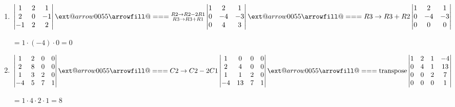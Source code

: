 \documentclass{beamer}
\makeatletter
\newcommand*{\Relbarfill@}{\arrowfill@\Relbar\Relbar\Relbar}
\newcommand*{\xequal}[2][]{\ext@arrow 0055\Relbarfill@{#1}{#2}}
\theoremstyle{definition}
\theoremstyle{remark}
\newcounter{saveenumi}
\newcommand{\conti}{\setcounter{enumi}{\value{saveenumi}}}
\makeatother
\begin{document}
\begin{frame}[t]
\begin{example}
\begin{enumerate}
\conti
\item 
$\left|\begin{matrix}
1&2&1\\
2&0&-1\\
-1&2&2\\
\end{matrix}\right|\xequal{\substack{R2\rightarrow R2-2R1\\R3\rightarrow R3+R1}}\left|\begin{matrix}
1&2&1\\
0&-4&-3\\
0&4&3\\
\end{matrix}\right|\xequal{R3\rightarrow R3+R2}\left|\begin{matrix}
1&2&1\\
0&-4&-3\\
0&0&0\\
\end{matrix}\right|$

$=1\cdot(-4)\cdot0=0$
\item 
$\left|\begin{matrix}
1&2&0&0\\
2&8&0&0\\
1&3&2&0\\
-4&5&7&1
\end{matrix}\right|\xequal{C2\to C2-2C1}\left|\begin{matrix}
1&0&0&0\\
2&4&0&0\\
1&1&2&0\\
-4&13&7&1
\end{matrix}\right|\xequal{\text{transpose}}\left|\begin{matrix}
1&2&1&-4\\
0&4&1&13\\
0&0&2&7\\
0&0&0&1
\end{matrix}\right|$

$=1\cdot4\cdot2\cdot1=8$
\end{enumerate}
\end{example}
\end{frame}
\end{document}

